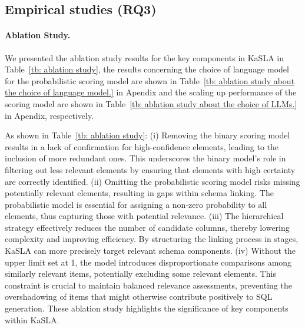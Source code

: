 \begin{table}[!h]
   \begin{center}
   \caption{Execution Accuracy (EX) (\%) of KaSLA trained on Spider-train but evaluated on BIRD-dev, and vice versa, for cross-scenario transfer ability evaluation.}
   \label{tb: trained on Spider-train but evaluated on BIRD-dev.}
\vspace{-4mm}
   \end{center}
   \end{table}
\subsection{Empirical studies (\textbf{RQ3})}
\paragraph{Ablation Study.}
We presented the ablation study results for the key components in KaSLA in Table~\ref{tb: ablation study}, the results concerning the choice of language model for the probabilistic scoring model are shown in Table~\ref{tb: ablation study about the choice of language model.} in Apendix and the scaling up performance of the scoring model are shown in Table~\ref{tb: ablation study about the choice of LLMs.} in Apendix, respectively.

As shown in Table~\ref{tb: ablation study}: (i) Removing the binary scoring model results in a lack of confirmation for high-confidence elements, leading to the inclusion of more redundant ones. This underscores the binary model's role in filtering out less relevant elements by ensuring that elements with high certainty are correctly identified. (ii) Omitting the probabilistic scoring model risks missing potentially relevant elements, resulting in gaps within schema linking. The probabilistic model is essential for assigning a non-zero probability to all elements, thus capturing those with potential relevance. (iii) The hierarchical strategy effectively reduces the number of candidate columns, thereby lowering complexity and improving efficiency. By structuring the linking process in stages, KaSLA can more precisely target relevant schema components. (iv) Without the upper limit set at 1, the model introduces disproportionate comparisons among similarly relevant items, potentially excluding some relevant elements. This constraint is crucial to maintain balanced relevance assessments, preventing the overshadowing of items that might otherwise contribute positively to SQL generation.
These ablation study highlights the significance of key components within KaSLA.

